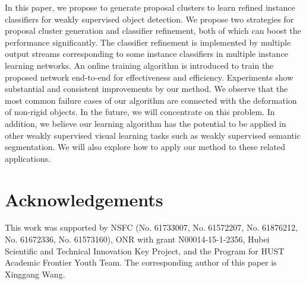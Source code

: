 \documentclass[10pt,journal,compsoc]{IEEEtran}
\begin{document}
In this paper, we propose to generate proposal clusters to learn refined instance classifiers for weakly supervised object detection.
We propose two strategies for proposal cluster generation and classifier refinement,
both of which can boost the performance significantly.
The classifier refinement is implemented by multiple output streams corresponding to some instance classifiers in multiple instance learning networks.
An online training algorithm is introduced to train the proposed network end-to-end for effectiveness and efficiency.
Experiments show substantial and consistent improvements by our method.
We observe that the most common failure cases of our algorithm are connected with the deformation of non-rigid objects.
In the future, we will concentrate on this problem.
In addition, we believe our learning algorithm has the potential to be applied in other weakly supervised visual learning tasks such as weakly supervised semantic segmentation.
We will also explore how to apply our method to these related applications.



\section*{Acknowledgements}
This work was supported by NSFC (No. 61733007, No. 61572207, No. 61876212, No. 61672336, No. 61573160), ONR with grant N00014-15-1-2356, Hubei Scientific and Technical Innovation Key Project, and the Program for HUST Academic Frontier Youth Team. The corresponding author of this paper is Xinggang Wang.



\ifCLASSOPTIONcaptionsoff
  \newpage
\fi







%
\end{document}
